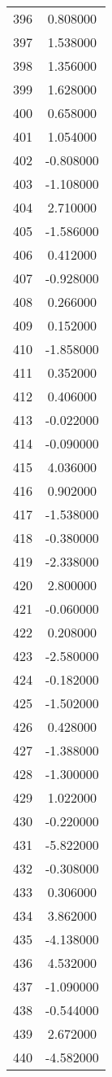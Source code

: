 \documentclass[12pt]{article}
\begin{document}
\begin{longtable}{@{}cc@{}}
396 & 0.808000 \\
397 & 1.538000 \\
398 & 1.356000 \\
399 & 1.628000 \\
400 & 0.658000 \\
401 & 1.054000 \\
402 & -0.808000 \\
403 & -1.108000 \\
404 & 2.710000 \\
405 & -1.586000 \\
406 & 0.412000 \\
407 & -0.928000 \\
408 & 0.266000 \\
409 & 0.152000 \\
410 & -1.858000 \\
411 & 0.352000 \\
412 & 0.406000 \\
413 & -0.022000 \\
414 & -0.090000 \\
415 & 4.036000 \\
416 & 0.902000 \\
417 & -1.538000 \\
418 & -0.380000 \\
419 & -2.338000 \\
420 & 2.800000 \\
421 & -0.060000 \\
422 & 0.208000 \\
423 & -2.580000 \\
424 & -0.182000 \\
425 & -1.502000 \\
426 & 0.428000 \\
427 & -1.388000 \\
428 & -1.300000 \\
429 & 1.022000 \\
430 & -0.220000 \\
431 & -5.822000 \\
432 & -0.308000 \\
433 & 0.306000 \\
434 & 3.862000 \\
435 & -4.138000 \\
436 & 4.532000 \\
437 & -1.090000 \\
438 & -0.544000 \\
439 & 2.672000 \\
440 & -4.582000 \\

\end{longtable}
\end{document}
